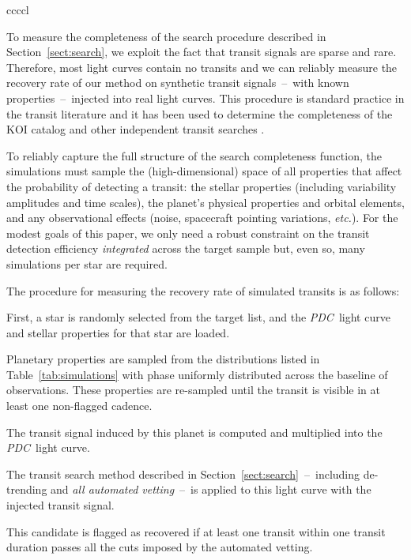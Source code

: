 \documentclass[manuscript, letterpaper]{aastex6}
\makeatletter
\let\origsection\section
\renewcommand\section{\@ifstar{\starsection}{\nostarsection}}
\newcommand\nostarsection[1]{\sectionprelude\origsection{#1}}
\newcommand\starsection[1]{\sectionprelude\origsection*{#1}}
\newcommand\sectionprelude{\vspace{1em}}
\newcommand{\project}[1]{\textsl{#1}}
\newcommand{\pdc}{\project{PDC}}
\newcommand{\foreign}[1]{\emph{#1}}
\newcommand{\etc}{\foreign{etc.}}
\newcommand{\sectionname}{Section}
\newcommand{\sectref}[1]{\ref{sect:#1}}
\newcommand{\Sect}[1]{\sectionname~\sectref{#1}}
\newcommand{\sect}[1]{\Sect{#1}}
\newcommand{\sectlabel}[1]{\label{sect:#1}}
\makeatother
\begin{document}
\begin{floattable}
\begin{deluxetable}{ccccl}
\tabletypesize{\footnotesize}
\caption{The signals rejected with a centroid shift or large impact parameter
\label{tab:rejects}}

\end{deluxetable}
\end{floattable}


\section{Empirical search completeness}\sectlabel{completeness}

To measure the completeness of the search procedure described in \sect{search}, we
exploit the fact that transit signals are sparse and rare.
Therefore, most light curves contain no transits and we can reliably measure
the recovery rate of our method on synthetic transit signals~--~with known
properties~--~injected into real light curves.
This procedure is standard practice in the transit literature and it has been
used to determine the completeness of the KOI catalog
\citep{Christiansen:2013, Christiansen:2015} and other independent transit
searches \citep{Petigura:2013, Dressing:2015, Foreman-Mackey:2015}.

To reliably capture the full structure of the search completeness function,
the simulations must sample the (high-dimensional) space of all properties
that affect the probability of detecting a transit: the stellar properties
(including variability amplitudes and time scales), the planet's physical
properties and orbital elements, and any observational effects (noise,
spacecraft pointing variations, \etc).
For the modest goals of this paper, we only need a robust constraint on the
transit detection efficiency \emph{integrated} across the target sample but,
even so, many simulations per star are required.

The procedure for measuring the recovery rate of simulated transits is as
follows:
\begin{enumerate}
{\item First, a star is randomly selected from the target list, and the \pdc\
light curve and stellar properties for that star are loaded.}
{\item Planetary properties are sampled from the distributions listed in
Table~\ref{tab:simulations} with phase uniformly distributed across the
baseline of observations. These properties are re-sampled until the transit is
visible in at least one non-flagged cadence.}
{\item The transit signal induced by this planet is computed and multiplied
into the \pdc\ light curve.}
{\item The transit search method described in \sect{search}~--~including
de-trending and \emph{all automated vetting}~--~is applied to this light
curve with the injected transit signal.}
{\item This candidate is flagged as recovered if at least one transit within
one transit duration passes all the cuts imposed by the automated vetting.}
\end{enumerate}
\end{document}
